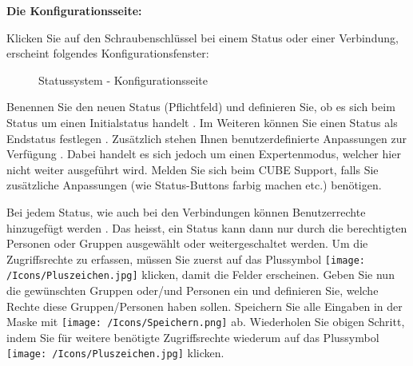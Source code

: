 \vspace{\baselineskip}

\pagebreak
\textbf{Die Konfigurationsseite:}

\vspace{\baselineskip}

Klicken Sie auf den Schraubenschlüssel  bei einem Status oder einer Verbindung, erscheint folgendes Konfigurationsfenster:

\begin{figure}[H]
\caption{Statussystem - Konfigurationsseite}
\end{figure}

Benennen Sie den neuen Status  (Pflichtfeld) und definieren Sie, ob es sich beim Status um einen Initialstatus handelt . Im Weiteren können Sie einen Status als Endstatus festlegen . Zusätzlich stehen Ihnen benutzerdefinierte Anpassungen zur Verfügung . Dabei handelt es sich jedoch um einen Expertenmodus, welcher hier nicht weiter ausgeführt wird. Melden Sie sich beim CUBE Support, falls Sie zusätzliche Anpassungen (wie Status-Buttons farbig machen etc.) benötigen.

\vspace{\baselineskip}

Bei jedem Status, wie auch bei den Verbindungen können Benutzerrechte hinzugefügt werden . Das heisst, ein Status kann dann nur durch die berechtigten Personen oder Gruppen ausgewählt oder weitergeschaltet werden. Um die Zugriffsrechte zu erfassen, müssen Sie zuerst auf das Plussymbol \texttt{[image: /Icons/Pluszeichen.jpg]}  klicken, damit die Felder erscheinen. Geben Sie nun die gewünschten Gruppen oder/und Personen ein und definieren Sie, welche Rechte diese Gruppen/Personen haben sollen. Speichern Sie alle Eingaben in der Maske mit \texttt{[image: /Icons/Speichern.png]}  ab. Wiederholen Sie obigen Schritt, indem Sie für weitere benötigte Zugriffsrechte wiederum auf das Plussymbol \texttt{[image: /Icons/Pluszeichen.jpg]}  klicken.

